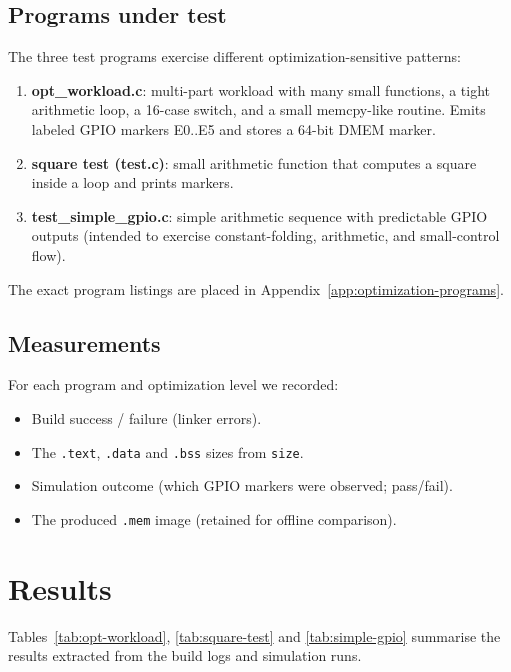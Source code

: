 \subsection{Programs under test}
The three test programs exercise different optimization-sensitive patterns:
\begin{enumerate}
  \item \textbf{opt\_workload.c}: multi-part workload with many small functions, a tight arithmetic loop, a 16-case switch, and a small memcpy-like routine. Emits labeled GPIO markers E0..E5 and stores a 64-bit DMEM marker.
  \item \textbf{square test (test.c)}: small arithmetic function that computes a square inside a loop and prints markers.
  \item \textbf{test\_simple\_gpio.c}: simple arithmetic sequence with predictable GPIO outputs (intended to exercise constant-folding, arithmetic, and small-control flow).
\end{enumerate}

The exact program listings are placed in Appendix~\ref{app:optimization-programs}.

\subsection{Measurements}
For each program and optimization level we recorded:
\begin{itemize}
  \item Build success / failure (linker errors).
  \item The \texttt{.text}, \texttt{.data} and \texttt{.bss} sizes from \texttt{size}.
  \item Simulation outcome (which GPIO markers were observed; pass/fail).
  \item The produced \texttt{.mem} image (retained for offline comparison).
\end{itemize}

\section{Results}
\label{sec:optim-results}

Tables~\ref{tab:opt-workload}, \ref{tab:square-test} and \ref{tab:simple-gpio} summarise the results extracted from the build logs and simulation runs.


